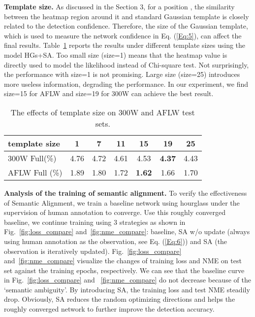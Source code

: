 \documentclass[10pt,twocolumn,letterpaper]{article}
\begin{document}
{{{			\textbf{Template size.} As discussed in the Section 3, 
			for a position , the similarity between the heatmap region around it and standard Gaussian template 
is
			closely related to the detection confidence. Therefore, the size of the Gaussian template, which is used 
			to {measure the network confidence} in Eq. (\ref{Eq:5}), can affect the final results. 
			Table~\ref{table_region} reports the results under different template sizes using the model HGs+SA. 
			Too small size (size=1)  means 
that the heatmap value is directly used to model the likelihood  instead of Chi-square test.  Not surprisingly, the performance with size=1 is not promising. Large size (size=25) introduces more useless information, degrading the performance. 
			In our experiment, {we find size=15 for AFLW and size=19 for 300W} can achieve the best result. 
			


			
			\begin{table}[!thp]
				\centering
\caption{The effects of template size on 300W  and AFLW test sets.}
				\vspace{3pt}
				\footnotesize
				\label{table_region}
				\begin{tabular}{l|cccccc}
					\hline
					template size    & 1 & 7 & 11 & 15 & 19 & 25 \\
					\hline
					300W Full(\%) & 4.76 & 4.72 & 4.61 & 4.53 & \textbf{4.37} & 4.43 \\
					\hline
					AFLW Full (\%) & 1.89 & 1.80 & 1.72 & \textbf{1.62} & 1.66 & 1.70 \\
					\hline
				\end{tabular}
			\end{table}
			
			\textbf{Analysis of the training of semantic alignment.} 
			To verify the effectiveness of Semantic Alignment, we train a baseline network using hourglass 
under the supervision of
			human annotation to converge. 
			Use this roughly converged baseline, we continue training using
			3 strategies as shown in Fig.~\ref{fig:loss_compare} and~\ref{fig:nme_compare}: baseline, SA w/o update (always using human annotation as the observation, see Eq. (\ref{Eq:6})) and SA (the observation is {iteratively} updated). 
			Fig.~\ref{fig:loss_compare} and~\ref{fig:nme_compare} {visualize the changes of training loss and NME on test set against the training epochs, respectively.}
{We can see that the baseline curve in Fig.~\ref{fig:loss_compare} and ~\ref{fig:nme_compare} do not decrease because of the `semantic ambiguity'. By introducing SA, the training loss and test NME steadily drop. Obviously, SA reduces the random optimizing directions and helps the roughly converged network to further improve the detection accuracy.
}
			
}}}
\end{document}
